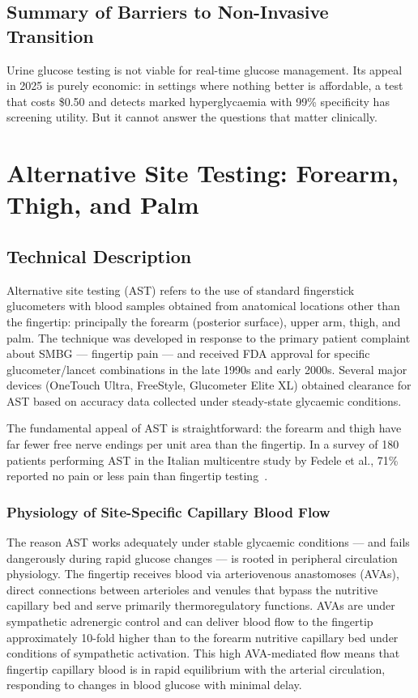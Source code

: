 \section{Summary of Barriers to Non-Invasive Transition}

Urine glucose testing is not viable for real-time glucose management. Its appeal in 2025 is purely economic: in settings where nothing better is affordable, a test that costs \$0.50 and detects marked hyperglycaemia with 99\% specificity has screening utility. But it cannot answer the questions that matter clinically.

\chapter{Alternative Site Testing: Forearm, Thigh, and Palm}
\label{ch:ast}

\section{Technical Description}

Alternative site testing (AST) refers to the use of standard fingerstick glucometers with blood samples obtained from anatomical locations other than the fingertip: principally the forearm (posterior surface), upper arm, thigh, and palm. The technique was developed in response to the primary patient complaint about SMBG --- fingertip pain --- and received FDA approval for specific glucometer/lancet combinations in the late 1990s and early 2000s. Several major devices (OneTouch Ultra, FreeStyle, Glucometer Elite XL) obtained clearance for AST based on accuracy data collected under steady-state glycaemic conditions.

The fundamental appeal of AST is straightforward: the forearm and thigh have far fewer free nerve endings per unit area than the fingertip. In a survey of 180 patients performing AST in the Italian multicentre study by Fedele et al., 71\% reported no pain or less pain than fingertip testing~\cite{fedele2003}.

\subsection*{Physiology of Site-Specific Capillary Blood Flow}

The reason AST works adequately under stable glycaemic conditions --- and fails dangerously during rapid glucose changes --- is rooted in peripheral circulation physiology. The fingertip receives blood via arteriovenous anastomoses (AVAs), direct connections between arterioles and venules that bypass the nutritive capillary bed and serve primarily thermoregulatory functions. AVAs are under sympathetic adrenergic control and can deliver blood flow to the fingertip approximately 10-fold higher than to the forearm nutritive capillary bed under conditions of sympathetic activation. This high AVA-mediated flow means that fingertip capillary blood is in rapid equilibrium with the arterial circulation, responding to changes in blood glucose with minimal delay.

